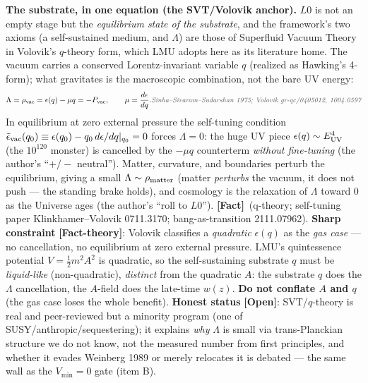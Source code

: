 \documentclass[11pt]{article}
\newcommand{\Fact}{\textbf{\textcolor{green!45!black}{[Fact]}}}
\newcommand{\Open}{\textbf{\textcolor{gray!10!black}{[Open]}}}
\newcommand{\factth}{\textcolor{green!40!black}{\textbf{[Fact-theory]}}}
\newcommand{\own}[1]{\hfill{\small\textcolor{gray!70!black}{\textit{#1}}}}
\begin{document}
\noindent\textbf{The substrate, in one equation (the SVT/Volovik anchor).} $L0$ is not an empty stage but the \emph{equilibrium state of the substrate}, and the framework's two axioms (a self-sustained medium, and $\Lambda$) are those of Superfluid Vacuum Theory in Volovik's $q$-theory form, which LMU adopts here as its literature home. The vacuum carries a conserved Lorentz-invariant variable $q$ (realized as Hawking's 4-form); what gravitates is the macroscopic combination, not the bare UV energy:
\begin{equation}
\Lambda=\rho_{\rm vac}=\epsilon(q)-\mu q=-P_{\rm vac},\qquad \mu=\frac{d\epsilon}{dq}.
\own{Sinha--Sivaram--Sudarshan 1975; Volovik gr-qc/0405012, 1004.0597}
\label{eq:svtlambda}
\end{equation}
In equilibrium at zero external pressure the self-tuning condition $\tilde\epsilon_{\rm vac}(q_0)\equiv\epsilon(q_0)-q_0\,d\epsilon/dq|_{q_0}=0$ forces $\Lambda=0$: the huge UV piece $\epsilon(q)\sim E_{\rm UV}^4$ (the $10^{120}$ monster) is cancelled by the $-\mu q$ counterterm \emph{without fine-tuning} (the author's ``$+/-$ neutral''). Matter, curvature, and boundaries perturb the equilibrium, giving a small $\Lambda\sim\rho_{\rm matter}$ (matter \emph{perturbs} the vacuum, it does not push --- the standing brake holds), and cosmology is the relaxation of $\Lambda$ toward $0$ as the Universe ages (the author's ``roll to $L0$''). \Fact\ (q-theory; self-tuning paper Klinkhamer--Volovik 0711.3170; bang-as-transition 2111.07962). \textbf{Sharp constraint} \factth: Volovik classifies a \emph{quadratic} $\epsilon(q)$ as the \emph{gas case} --- no cancellation, no equilibrium at zero external pressure. LMU's quintessence potential $V=\tfrac12 m^2A^2$ is quadratic, so the self-sustaining substrate $q$ must be \emph{liquid-like} (non-quadratic), \emph{distinct} from the quadratic $A$: the substrate $q$ does the $\Lambda$ cancellation, the $A$-field does the late-time $w(z)$. \textbf{Do not conflate $A$ and $q$} (the gas case loses the whole benefit). \textbf{Honest status} \Open: SVT/$q$-theory is real and peer-reviewed but a minority program (one of SUSY/anthropic/sequestering); it explains \emph{why} $\Lambda$ is small via trans-Planckian structure we do not know, not the measured number from first principles, and whether it evades Weinberg 1989 or merely relocates it is debated --- the same wall as the $V_{\min}=0$ gate (item B).
\end{document}
